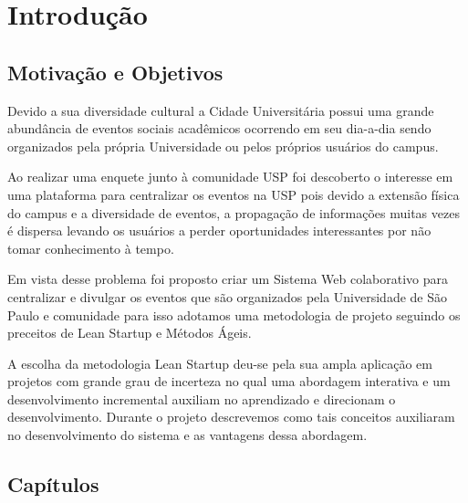 \chapter{Introdução}
\label{cap:introducao}
\section{Motivação e Objetivos}

\par Devido a sua diversidade cultural a Cidade Universitária possui uma grande abundância de eventos sociais acadêmicos ocorrendo em seu dia-a-dia sendo organizados pela própria Universidade ou pelos próprios usuários do campus.

\par Ao realizar uma enquete junto à comunidade USP foi descoberto o interesse em uma plataforma para centralizar os eventos na USP pois devido a extensão física do campus e a diversidade de eventos, a propagação de informações muitas vezes é dispersa levando os usuários a perder oportunidades interessantes por não tomar conhecimento à tempo.

\par Em vista desse problema foi proposto criar um Sistema Web colaborativo para centralizar e divulgar os eventos que são organizados pela Universidade de São Paulo e comunidade para isso adotamos uma metodologia de projeto seguindo os preceitos de Lean Startup e Métodos Ágeis.

\par A escolha da metodologia Lean Startup deu-se pela sua ampla aplicação em projetos com grande grau de incerteza no qual uma abordagem interativa e um desenvolvimento incremental auxiliam no aprendizado e direcionam o desenvolvimento. Durante o projeto descrevemos como tais conceitos auxiliaram no desenvolvimento do sistema e as vantagens dessa abordagem.

\section{Capítulos}
